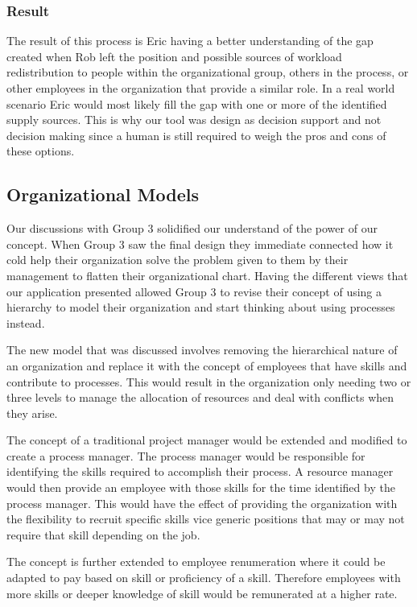 \documentclass[journal]{vgtc}                %
\begin{document}
\subsubsection{Result}
The result of this process is Eric having a better understanding of the gap created when Rob left the position and possible sources of workload redistribution to people within the organizational group, others in the process, or other employees in the organization that provide a similar role.
In a real world scenario Eric would most likely fill the gap with one or more of the identified supply sources.  This is why our tool was design as decision support and not decision making since a human is still required to weigh the pros and cons of these options.

\subsection{Organizational Models}
Our discussions with Group 3 solidified our understand of the power of our concept.  When Group 3 saw the final design they immediate connected how it cold help their organization solve the problem given to them by their management to flatten their organizational chart.  Having the different views that our application presented allowed Group 3 to revise their concept of using a hierarchy to model their organization and start thinking about using processes instead.

The new model that was discussed involves removing the hierarchical nature of an organization and replace it with the concept of employees that have skills and contribute to processes.  This would result in the organization only needing two or three levels to manage the allocation of resources and deal with conflicts when they arise.

The concept of a traditional project manager would be extended and modified to create a process manager.  The process manager would be responsible for identifying the skills required to accomplish their process.  A resource manager would then provide an employee with those skills for the time identified by the process manager.  This would have the effect of providing the organization with the flexibility to recruit specific skills vice generic positions that may or may not require that skill depending on the job.

The concept is further extended to employee renumeration where it could be adapted to pay based on skill or proficiency of a skill.  Therefore employees with more skills or deeper knowledge of skill would be remunerated at a higher rate.
\end{document}
